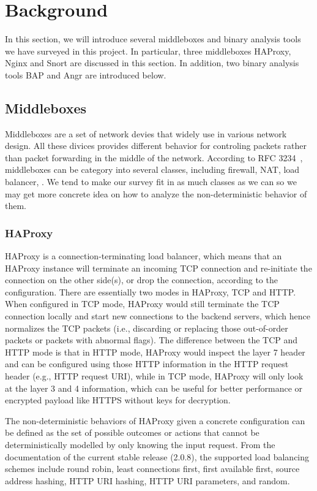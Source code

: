 \section{Background}

In this section, we will introduce several middleboxes and binary analysis tools we have surveyed in this project.
In particular, three middleboxes \ca HAProxy, \cb Nginx and \cc Snort are discussed in this section.
In addition, two binary analysis tools \ca BAP and \cb Angr are introduced below.

\subsection{Middleboxes}
Middleboxes are a set of network devies that widely use in various network design.
All these divices provides different behavior for controling packets rather than packet forwarding in the middle of the network.
According to RFC 3234~\cite{rfc3234}, middleboxes can be category into several classes, including firewall, NAT, load balancer, \etc.
We tend to make our survey fit in as much classes as we can so we may get more concrete idea on how to analyze the non-deterministic behavior of them.

\subsubsection{HAProxy}
HAProxy is a connection-terminating load balancer, which means that an HAProxy instance will terminate an incoming TCP connection and re-initiate the connection on the other side(s), or drop the connection, according to the configuration. There are essentially two modes in HAProxy, TCP and HTTP. When configured in TCP mode, HAProxy would still terminate the TCP connection locally and start new connections to the backend servers, which hence normalizes the TCP packets (i.e., discarding or replacing those out-of-order packets or packets with abnormal flags). The difference between the TCP and HTTP mode is that in HTTP mode, HAProxy would inspect the layer 7 header and can be configured using those HTTP information in the HTTP request header (e.g., HTTP request URI), while in TCP mode, HAProxy will only look at the layer 3 and 4 information, which can be useful for better performance or encrypted payload like HTTPS without keys for decryption.

The non-deterministic behaviors of HAProxy given a concrete configuration can be defined as the set of possible outcomes or actions that cannot be deterministically modelled by only knowing the input request. From the documentation of the current stable release (2.0.8), the supported load balancing schemes include round robin, least connections first, first available first, source address hashing, HTTP URI hashing, HTTP URI parameters, and random.

